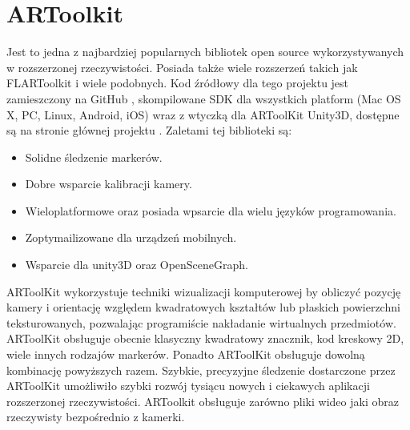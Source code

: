 
\section{ARToolkit}
\label{sec:artoolkit}

Jest to jedna z najbardziej popularnych bibliotek open source wykorzystywanych w rozszerzonej rzeczywistości. Posiada także wiele rozszerzeń takich jak FLARToolkit i wiele podobnych. Kod źródłowy dla tego projektu jest zamieszczony na GitHub \cite{ARToolkit}, skompilowane SDK dla wszystkich platform (Mac OS X, PC, Linux, Android, iOS) wraz z wtyczką dla ARToolKit Unity3D, dostępne są na stronie głównej projektu \cite{ARToolkit}. Zaletami tej biblioteki są:
\begin{itemize}
	\item Solidne śledzenie markerów.
	\item Dobre wsparcie kalibracji kamery.
	\item Wieloplatformowe oraz posiada wpsarcie dla wielu języków programowania.
	\item Zoptymailizowane dla urządzeń mobilnych.
	\item Wsparcie dla unity3D oraz OpenSceneGraph.
\end{itemize}

ARToolKit wykorzystuje techniki wizualizacji komputerowej by obliczyć pozycję kamery i orientację względem kwadratowych kształtów lub płaskich powierzchni teksturowanych, pozwalając programiście nakładanie wirtualnych przedmiotów. ARToolKit obsługuje obecnie klasyczny kwadratowy znacznik, kod kreskowy 2D, wiele innych rodzajów markerów. Ponadto ARToolKit obsługuje dowolną kombinację powyższych razem. Szybkie, precyzyjne śledzenie dostarczone przez ARToolKit umożliwiło szybki rozwój tysiącu nowych i ciekawych aplikacji rozszerzonej rzeczywistości. ARToolkit obsługuje zarówno pliki wideo jaki obraz rzeczywisty bezpośrednio z kamerki.

